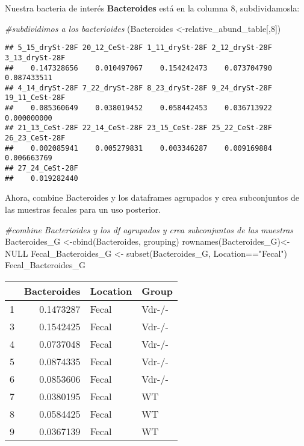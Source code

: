 \documentclass[
]{article}
\newenvironment{Shaded}{\begin{snugshade}}{\end{snugshade}}
\newcommand{\CommentTok}[1]{\textcolor[rgb]{0.56,0.35,0.01}{\textit{#1}}}
\newcommand{\ConstantTok}[1]{\textcolor[rgb]{0.00,0.00,0.00}{#1}}
\newcommand{\DecValTok}[1]{\textcolor[rgb]{0.00,0.00,0.81}{#1}}
\newcommand{\FunctionTok}[1]{\textcolor[rgb]{0.00,0.00,0.00}{#1}}
\newcommand{\NormalTok}[1]{#1}
\newcommand{\OtherTok}[1]{\textcolor[rgb]{0.56,0.35,0.01}{#1}}
\newcommand{\SpecialCharTok}[1]{\textcolor[rgb]{0.00,0.00,0.00}{#1}}
\newcommand{\StringTok}[1]{\textcolor[rgb]{0.31,0.60,0.02}{#1}}
\begin{document}
Nuestra bacteria de interés \textbf{Bacteroides} está en la columna 8,
subdividamosla:

\begin{Shaded}
\begin{Highlighting}[]
\CommentTok{\#subdividimos a los bacterioides}
\NormalTok{(Bacteroides }\OtherTok{\textless{}{-}}\NormalTok{relative\_abund\_table[,}\DecValTok{8}\NormalTok{]) }
\end{Highlighting}
\end{Shaded}

\begin{verbatim}
## 5_15_drySt-28F 20_12_CeSt-28F 1_11_drySt-28F 2_12_drySt-28F 3_13_drySt-28F 
##    0.147328656    0.010497067    0.154242473    0.073704790    0.087433511 
## 4_14_drySt-28F 7_22_drySt-28F 8_23_drySt-28F 9_24_drySt-28F 19_11_CeSt-28F 
##    0.085360649    0.038019452    0.058442453    0.036713922    0.000000000 
## 21_13_CeSt-28F 22_14_CeSt-28F 23_15_CeSt-28F 25_22_CeSt-28F 26_23_CeSt-28F 
##    0.002085941    0.005279831    0.003346287    0.009169884    0.006663769 
## 27_24_CeSt-28F 
##    0.019282440
\end{verbatim}

Ahora, combine Bacteroides y los dataframes agrupados y crea
subconjuntos de las muestras fecales para un uso posterior.

\begin{Shaded}
\begin{Highlighting}[]
\CommentTok{\#combine Bacterioides y los df agrupados y crea subconjuntos de las muestras}
\NormalTok{Bacteroides\_G }\OtherTok{\textless{}{-}}\FunctionTok{cbind}\NormalTok{(Bacteroides, grouping)}
\FunctionTok{rownames}\NormalTok{(Bacteroides\_G)}\OtherTok{\textless{}{-}}\ConstantTok{NULL}
\NormalTok{Fecal\_Bacteroides\_G }\OtherTok{\textless{}{-}} \FunctionTok{subset}\NormalTok{(Bacteroides\_G, Location}\SpecialCharTok{==}\StringTok{"Fecal"}\NormalTok{)}
\NormalTok{Fecal\_Bacteroides\_G}
\end{Highlighting}
\end{Shaded}

\begin{longtable}[]{@{}lrll@{}}
\toprule()
& Bacteroides & Location & Group \\
\midrule()
\endhead
1 & 0.1473287 & Fecal & Vdr-/- \\
3 & 0.1542425 & Fecal & Vdr-/- \\
4 & 0.0737048 & Fecal & Vdr-/- \\
5 & 0.0874335 & Fecal & Vdr-/- \\
6 & 0.0853606 & Fecal & Vdr-/- \\
7 & 0.0380195 & Fecal & WT \\
8 & 0.0584425 & Fecal & WT \\
9 & 0.0367139 & Fecal & WT \\
\bottomrule()
\end{longtable}
\end{document}
